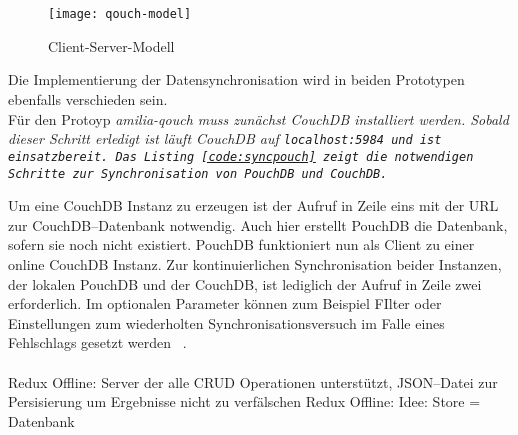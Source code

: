 \\\\
%
% 
%
\begin{figure}[H]
  \centering
  \texttt{[image: qouch-model]}
  \grayRule
  \caption{Client-Server-Modell}
  \label{fig:qouch-model}
\end{figure}
%
%

%
%
Die Implementierung der Datensynchronisation wird in beiden Prototypen ebenfalls verschieden sein.\\
Für den Protoyp \it{amilia-qouch} muss zunächst CouchDB installiert werden.
Sobald dieser Schritt erledigt ist läuft CouchDB auf \tt{localhost:5984} und ist einsatzbereit. Das Listing \ref{code:syncpouch} zeigt die notwendigen Schritte zur Synchronisation von PouchDB und CouchDB.
\begin{center}
  
\end{center}
Um eine CouchDB Instanz zu erzeugen ist der Aufruf in Zeile eins mit der URL zur CouchDB--Datenbank notwendig. Auch hier erstellt PouchDB die Datenbank, sofern sie noch nicht existiert. PouchDB funktioniert nun als Client zu einer online CouchDB Instanz. Zur kontinuierlichen Synchronisation beider Instanzen, der lokalen PouchDB und der CouchDB, ist lediglich der Aufruf in Zeile zwei erforderlich. Im optionalen Parameter können zum Beispiel FIlter oder Einstellungen zum wiederholten Synchronisationsversuch im Falle eines Fehlschlags gesetzt werden ~\cite{pouch_options}.\\\\
%
%
Redux Offline: Server der alle \gls{CRUD} Operationen unterstützt,
\gls{JSON}--Datei zur Persisierung um Ergebnisse nicht zu verfälschen 
Redux Offline: Idee: Store = Datenbank
%
%

%
%

%
%
